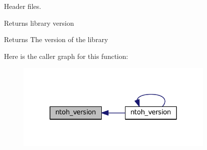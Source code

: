 Header files. 

Returns library version \begin{DoxyReturn}{Returns}
The version of the library 
\end{DoxyReturn}


Here is the caller graph for this function\-:
\nopagebreak
\begin{figure}[H]
\begin{center}
\leavevmode
\includegraphics[width=272pt]{namespacelibntoh_aaac2d93f6819e10075e65ad7a5eb6e9d_icgraph}
\end{center}
\end{figure}


